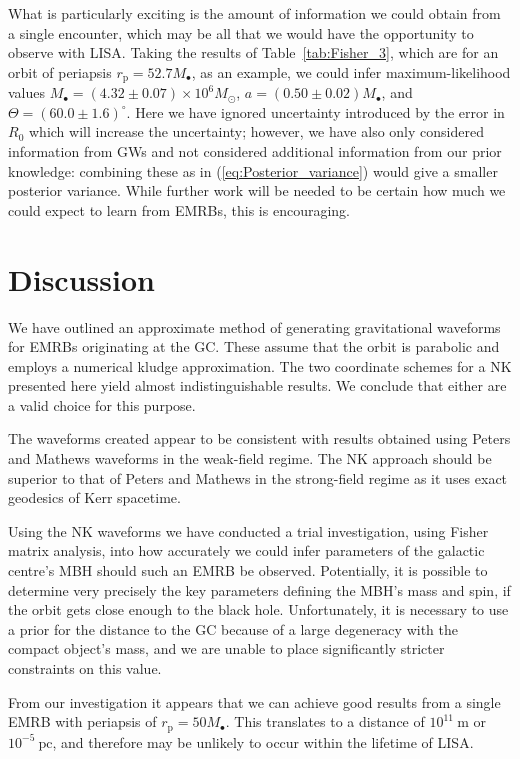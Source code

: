 \documentclass[useAMS,usedcolumn,usegraphicx,usenatbib]{mn2e}
\newcommand{\eqnref}[1]{(\ref{eq:#1})}
\newcommand{\tabref}[1]{Table~\ref{tab:#1}}
\newcommand{\units}[1]{\ensuremath{~\mathrm{#1}}}
\newcommand{\sub}[1]{\ensuremath{_\mathrm{#1}}}
\begin{document}
{What is particularly exciting is the amount of information we could obtain from a single encounter, which may be all that we would have the opportunity to observe with LISA. Taking the results of \tabref{Fisher_3}, which are for an orbit of periapsis $r\sub{p} = 52.7 M_\bullet$, as an example, we could infer maximum-likelihood values $M_\bullet = (4.32 \pm 0.07) \times 10^6 M_\odot$, $a = (0.50{} \pm {}0.02) M_\bullet$, and $\Theta = {(60.0 \pm 1.6)^{\circ}}$. Here we have ignored uncertainty introduced by the error in $R_0$ which will increase the uncertainty; however, we have also only considered information from GWs and not considered additional information from our prior knowledge: combining these as in \eqnref{Posterior_variance} would give a smaller posterior variance. While further work will be needed to be certain how much we could expect to learn from EMRBs, this is encouraging.



\section{Discussion}\label{sec:End}

We have outlined an approximate method of generating gravitational waveforms for EMRBs originating at the GC. These assume that the orbit is parabolic and employs a numerical kludge approximation. The two coordinate schemes for a NK presented here yield almost indistinguishable results. We conclude that either are a valid choice for this purpose.

The waveforms created appear to be consistent with results obtained using Peters and Mathews waveforms in the weak-field regime. The NK approach should be superior to that of Peters and Mathews in the strong-field regime as it uses exact geodesics of Kerr spacetime.

Using the NK waveforms we have conducted a trial investigation, using Fisher matrix analysis, into how accurately we could infer parameters of the galactic centre's MBH should such an EMRB be observed. Potentially, it is possible to determine very precisely the key parameters defining the MBH's mass and spin, if the orbit gets close enough to the black hole. Unfortunately, it is necessary to use a prior for the distance to the GC because of a large degeneracy with the compact object's mass, and we are unable to place significantly stricter constraints on this value.

From our investigation it appears that we can achieve good results from a single EMRB with periapsis of $r\sub{p} = 50 M_\bullet$. This translates to a distance of $10^{11}\units{m}$ or $10^{-5}\units{pc}$, and therefore may be unlikely to occur within the lifetime of LISA.

}
\end{document}

